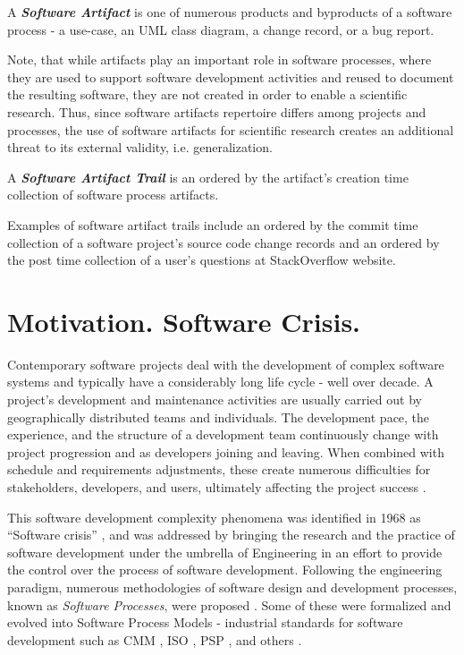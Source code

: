 \begin{defn}\label{def_artifact}
A \textbf{\textit{Software Artifact}} is one of numerous products and byproducts of a software process - 
a use-case, an UML class diagram, a change record, or a bug report. 
\end{defn}
Note, that while artifacts play an important role in software processes, where they are used to support 
software development activities and reused to document the resulting software, they are not created 
in order to enable a scientific research. Thus, since software artifacts repertoire differs among projects 
and processes, the use of software artifacts for scientific research creates an additional threat to its 
external validity, i.e. generalization.

\begin{defn}\label{def_artifact_trail}
A \textbf{\textit{Software Artifact Trail}} is an ordered by the artifact's creation time collection of 
software process artifacts.
\end{defn}
Examples of software artifact trails include an ordered by the commit time collection of a software project's 
source code change records and an ordered by the post time collection of a user's questions at StackOverflow 
website.

\newpage
%
%
\section{Motivation. Software Crisis.}\label{section_background}

Contemporary software projects deal with the development of complex software systems and typically have 
a considerably long life cycle - well over decade.
A project's development and maintenance activities are usually carried out by geographically 
distributed teams and individuals. The development pace, the experience, and the structure of a 
development team continuously change with project progression and as developers joining and leaving. 
When combined with schedule and requirements adjustments, these create numerous difficulties 
for stakeholders, developers, and users, ultimately affecting the project success \cite{citeulike:2207657}. 

This software development complexity phenomena was identified in 1968 as ``Software crisis'' 
\cite{naur_crisis_68}, and was addressed by bringing the research and the practice of software 
development under the umbrella of Engineering in an effort to provide the control over the process 
of software development. 
Following the engineering paradigm, numerous methodologies of software design and development 
processes, known as \textit{Software Processes}, were proposed \cite{citeulike:10002165}.
Some of these were formalized and evolved into Software Process Models - industrial standards for 
software development such as CMM \cite{citeulike:9962021}, ISO \cite{iso-standard}, 
PSP \cite{citeulike:8347315}, and others \cite{citeulike:5043104}. 

